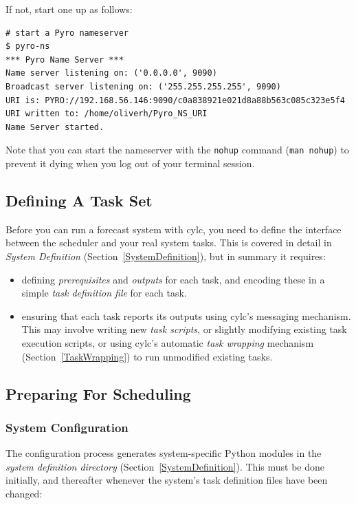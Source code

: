 \documentclass[11pt,a4paper]{article}
\begin{document}
If not, start one up as follows:

\begin{lstlisting}
# start a Pyro nameserver
$ pyro-ns
*** Pyro Name Server ***
Name server listening on: ('0.0.0.0', 9090)
Broadcast server listening on: ('255.255.255.255', 9090)
URI is: PYRO://192.168.56.146:9090/c0a838921e021d8a88b563c085c323e5f4
URI written to: /home/oliverh/Pyro_NS_URI
Name Server started.
\end{lstlisting}

Note that you can start the nameserver with the \lstinline=nohup=
command (\lstinline=man nohup=) to prevent it dying when you log out of
your terminal session.

\subsection{Defining A Task Set} 
\label{QuickDefiningATaskSet}

Before you can run a forecast system with cylc, you need to define the
interface between the scheduler and your real system tasks.  This
is covered in detail in {\em System Definition}
(Section~\ref{SystemDefinition}), but in summary it requires:

\begin{itemize}
    \item defining {\em prerequisites} and {\em outputs} for each task,
        and encoding these in a simple {\em task definition file} for
        each task.

    \item ensuring that each task reports its outputs using cylc's
        messaging mechanism.  This may involve writing new {\em task
        scripts}, or slightly modifying existing task execution scripts,
        or using cylc's automatic {\em task wrapping} mechanism
        (Section~\ref{TaskWrapping}) to run unmodified existing tasks.
\end{itemize}


\subsection{Preparing For Scheduling}
\label{QuickPreparingForScheduling}

\subsubsection{System Configuration}
\label{QuickConfiguration}

The configuration process generates
system-specific Python modules in the {\em system definition directory}
(Section~\ref{SystemDefinition}). This
must be done initially, and thereafter whenever the system's task
definition files have been changed:
\end{document}
